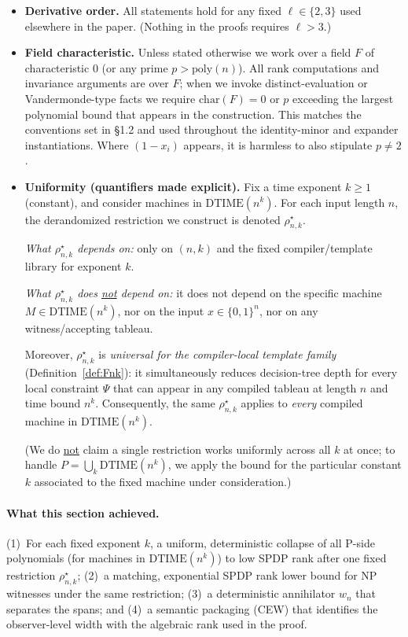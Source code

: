 \documentclass[12pt]{article}
\theoremstyle{definition}
\theoremstyle{definition}
\theoremstyle{remark}
\theoremstyle{remark}
\begin{document}
\begin{itemize}
\item \textbf{Derivative order.} All statements hold for any fixed $\ell\in\{2,3\}$ used elsewhere in the paper. (Nothing in the proofs requires $\ell>3$.)
\item \textbf{Field characteristic.} Unless stated otherwise we work over a field $F$ of characteristic 0 (or any prime $p > \mathrm{poly}(n)$). All rank computations and invariance arguments are over $F$; when we invoke distinct-evaluation or Vandermonde-type facts we require $\mathrm{char}(F) = 0$ or $p$ exceeding the largest polynomial bound that appears in the construction. This matches the conventions set in \S1.2 and used throughout the identity-minor and expander instantiations. Where $(1-x_i)$ appears, it is harmless to also stipulate $p\neq 2$.
\item \textbf{Uniformity (quantifiers made explicit).}
Fix a time exponent $k\ge 1$ (constant), and consider machines in $\mathrm{DTIME}(n^k)$.
For each input length $n$, the derandomized restriction we construct is denoted
$\rho^\star_{n,k}$.

\emph{What $\rho^\star_{n,k}$ depends on:} only on $(n,k)$ and the fixed compiler/template
library for exponent $k$.

\emph{What $\rho^\star_{n,k}$ does \underline{not} depend on:} it does not depend on the
specific machine $M\in \mathrm{DTIME}(n^k)$, nor on the input $x\in\{0,1\}^n$, nor on any
witness/accepting tableau.

Moreover, $\rho^\star_{n,k}$ is \emph{universal for the compiler-local template family}
(Definition~\ref{def:Fnk}): it simultaneously reduces decision-tree depth for every
local constraint $\Psi$ that can appear in any compiled tableau at length $n$ and time bound
$n^k$. Consequently, the same $\rho^\star_{n,k}$ applies to \emph{every} compiled machine in
$\mathrm{DTIME}(n^k)$.

(We do \underline{not} claim a single restriction works uniformly across all $k$ at once; to
handle $P=\bigcup_k \mathrm{DTIME}(n^k)$, we apply the bound for the particular constant $k$
associated to the fixed machine under consideration.)
\end{itemize}

\paragraph{What this section achieved.}
(1)~For each fixed exponent $k$, a uniform, deterministic collapse of all P-side polynomials (for machines in $\mathrm{DTIME}(n^k)$) to low SPDP rank after one fixed restriction $\rho^\star_{n,k}$; (2)~a matching, exponential SPDP rank lower bound for NP witnesses under the same restriction; (3)~a deterministic annihilator $w_n$ that separates the spans; and (4)~a semantic packaging (CEW) that identifies the observer-level width with the algebraic rank used in the proof.
\end{document}

